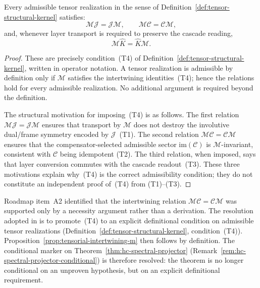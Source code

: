 \begin{proposition}
\label{prop:tensorial-intertwining-m}
Every admissible tensor realization in the sense of
Definition~\ref{def:tensor-structural-kernel} satisfies:
\[
\mathcal M\mathcal J=\mathcal J\mathcal M,
\qquad
\mathcal M\mathcal C=\mathcal C\mathcal M,
\]
and, whenever layer transport is required to preserve the cascade reading,
\[
\mathcal M\hat K=\hat K\mathcal M.
\]
\end{proposition}

\begin{proof}
These are precisely condition~(T4) of
Definition~\ref{def:tensor-structural-kernel}, written in operator
notation. A tensor realization is admissible by definition only if
$\mathcal M$ satisfies the intertwining identities~(T4); hence the
relations hold for every admissible realization. No additional argument
is required beyond the definition.

The structural motivation for imposing~(T4) is as follows. The first
relation $\mathcal M\mathcal J=\mathcal J\mathcal M$ ensures that
transport by $\mathcal M$ does not destroy the involutive dual/frame
symmetry encoded by $\mathcal J$~(T1). The second relation
$\mathcal M\mathcal C=\mathcal C\mathcal M$ ensures that the
compensator-selected admissible sector $\mathrm{im}(\mathcal C)$ is
$\mathcal M$-invariant, consistent with $\mathcal C$ being idempotent
(T2). The third relation, when imposed, says that layer conversion
commutes with the cascade readout~(T3). These three motivations
explain why~(T4) is the correct admissibility condition; they do not
constitute an independent proof of~(T4) from (T1)--(T3).
\end{proof}

\begin{remark}
\label{rem:a2-resolved}
Roadmap item~A2 identified that the intertwining relation
$\mathcal M\mathcal C=\mathcal C\mathcal M$ was supported only by a
necessity argument rather than a derivation. The resolution adopted
in  is to promote~(T4) to an explicit definitional condition
on admissible tensor realizations
(Definition~\ref{def:tensor-structural-kernel}, condition~(T4)).
Proposition~\ref{prop:tensorial-intertwining-m} then follows by
definition. The conditional marker on
Theorem~\ref{thm:hc-spectral-projector}
(Remark~\ref{rem:hc-spectral-projector-conditional}) is therefore
resolved: the theorem is no longer conditional on an unproven
hypothesis, but on an explicit definitional requirement.
\end{remark}

